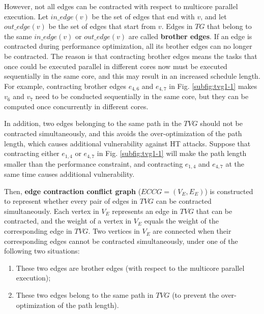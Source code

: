\documentclass[10pt,journal, compsoc]{IEEEtran}
\begin{document}
However, not all edges can be contracted with respect to multicore parallel execution. Let $in\_edge(v)$ be the set of edges that end with $v$, and let $out\_edge(v)$ be the set of edges that start from $v$. Edges in $TG$ that belong to the same $in\_edge(v)$ or $out\_edge(v)$ are called \textbf{brother edges}. If an edge is contracted during performance optimization, all its brother edges can no longer be contracted. The reason is that contracting brother edges means the tasks that once could be executed parallel in different cores now must be executed sequentially in the same core, and this may result in an increased schedule length. For example, contracting brother edges $e_{4,6}$ and $e_{4,7}$ in Fig. \ref{subfig:tvg1-1} makes $v_6$ and $v_7$ need to be conducted sequentially in the same core, but they can be computed once concurrently in different cores.

In addition, two edges belonging to the same path in the $TVG$ should not be contracted simultaneously, and this avoids the over-optimization of the path length, which causes additional vulnerability against HT attacks. Suppose that contracting either $e_{1,4}$ or $e_{4,7}$ in Fig. \ref{subfig:tvg1-1} will make the path length smaller than the performance constraint, and contracting $e_{1,4}$ and $e_{4,7}$ at the same time causes additional vulnerability.

Then, \textbf{edge contraction conflict graph} ($ECCG=(V_E,E_E)$) is constructed to represent whether every pair of edges in $TVG$ can be contracted simultaneously. Each vertex in $V_E$ represents an edge in $TVG$ that can be contracted, and the weight of a vertex in $V_E$ equals the weight of the corresponding edge in $TVG$. Two vertices in $V_E$ are connected when their corresponding edges cannot be contracted simultaneously, under one of the following two situations:
\begin{enumerate}
\item These two edges are brother edges (with respect to the multicore parallel execution);
\item These two edges belong to the same path in $TVG$ (to prevent the over-optimization of the path length).
\end{enumerate}
\end{document}
